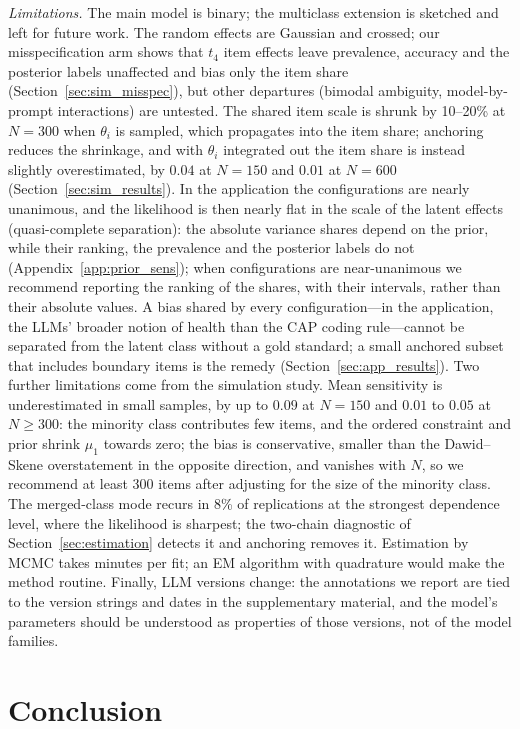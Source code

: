 \emph{Limitations.} The main model is binary; the multiclass extension is sketched and left for future work. The random effects are Gaussian and crossed; our misspecification arm shows that
$t_4$ item effects leave prevalence, accuracy and the posterior labels unaffected and
bias only the item share (Section~\ref{sec:sim_misspec}),
but other departures (bimodal ambiguity, model-by-prompt interactions) are untested. The shared item scale is shrunk by 10--20\% at $N = 300$ when $\theta_i$ is sampled, which propagates into the item share; anchoring reduces the shrinkage, and with $\theta_i$ integrated out the item share is instead slightly overestimated, by $0.04$ at $N = 150$ and $0.01$ at $N = 600$ (Section~\ref{sec:sim_results}).
In the application the configurations are nearly unanimous, and the likelihood is then nearly flat in the scale of the latent effects (quasi-complete separation): the absolute variance shares depend on the prior, while their ranking, the prevalence and the posterior labels do not (Appendix~\ref{app:prior_sens}); when configurations are near-unanimous we recommend reporting the ranking of the shares, with their intervals, rather than their absolute values.
A bias shared by every configuration---in the application, the LLMs' broader notion of health than the CAP coding rule---cannot be separated from the latent class without a gold standard; a small anchored subset that includes boundary items is the remedy (Section~\ref{sec:app_results}).
Two further limitations come from the simulation study. Mean sensitivity is underestimated in small samples, by up to $0.09$ at $N = 150$ and $0.01$ to $0.05$ at $N \ge 300$: the minority class contributes few items, and the ordered constraint and prior shrink $\mu_1$ towards zero; the bias is conservative, smaller than the Dawid--Skene overstatement in the opposite direction, and vanishes with $N$, so we recommend at least 300 items after adjusting for the size of the minority class. The merged-class mode recurs in 8\% of replications at the strongest dependence level, where the likelihood is sharpest; the two-chain diagnostic of Section~\ref{sec:estimation} detects it and anchoring removes it. Estimation by MCMC takes minutes per fit; an EM algorithm with quadrature would make the method routine. Finally, LLM versions change: the annotations we report are tied to the version strings and dates in the supplementary material, and the model's parameters should be understood as properties of those versions, not of the model families.

\section{Conclusion}\label{sec:conclusion}

